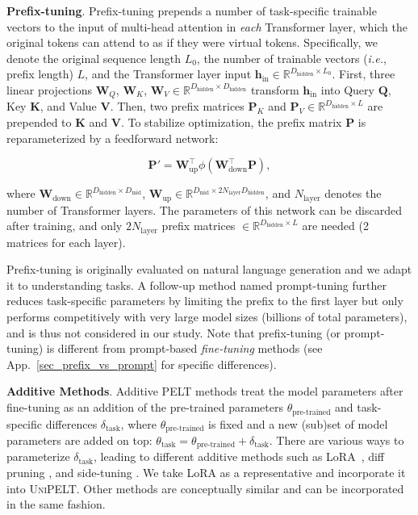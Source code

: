 {{\bf Prefix-tuning}.} Prefix-tuning \cite{li-liang-2021-prefix} prepends a number of task-specific trainable vectors to the input of multi-head attention in \textit{each} Transformer layer, which the original tokens can attend to as if they were virtual tokens. Specifically, we denote the original sequence length $L_0$, the number of trainable vectors (\textit{i.e.}, prefix length) $L$, and the Transformer layer input ${\bm{h}}_{\text{in}} \in {\mathbb{R}}^{D_{\text{hidden}} \times L_0}$. First, three linear projections ${\bm{W}}_Q$, ${\bm{W}}_K$, ${\bm{W}}_V  \in {\mathbb{R}}^{D_{\text{hidden}} \times D_{\text{hidden}}}$ transform ${\bm{h}}_{\text{in}}$ into Query ${\bm{Q}}$, Key ${\bm{K}}$, and Value ${\bm{V}}$.
Then, two prefix matrices ${\bm{P}}_K$ and ${\bm{P}}_V \in {\mathbb{R}}^{D_{\text{hidden}} \times L}$ are prepended to ${\bm{K}}$ and ${\bm{V}}$.
To stabilize optimization, the prefix matrix ${\bm{P}}$ is reparameterized by a feedforward network:

\begin{equation}
    {\bm{P}}' = {\bm{W}}_{\text{up}}^\intercal \phi({\bm{W}}_{\text{down}}^\intercal {\bm{P}}),
\end{equation}

where ${\bm{W}}_{\text{down}} \in {\mathbb{R}}^{D_{\text{hidden}} \times D_{\text{mid}}}$, ${\bm{W}}_{\text{up}} \in {\mathbb{R}}^{D_{\text{mid}} \times 2 N_{\text{layer}} D_{\text{hidden}}}$, and $N_{\text{layer}}$ denotes the number of Transformer layers. The parameters of this network can be discarded after training, and only $2N_{\text{layer}}$ prefix matrices $\in {\mathbb{R}}^{D_{\text{hidden}} \times L}$ are needed (2 matrices for each layer).

Prefix-tuning is originally evaluated on natural language generation and we adapt it to understanding tasks. A follow-up method named prompt-tuning \cite{lester2021power} further reduces task-specific parameters by limiting the prefix to the first layer but only performs competitively with very large model sizes (billions of total parameters), and is thus not considered in our study. Note that prefix-tuning (or prompt-tuning) is different from prompt-based \textit{fine-tuning} methods \cite{schick-schutze-2021-exploiting,gao-etal-2021-making} (see App.~\ref{sec_prefix_vs_prompt} for specific differences).

{{\bf Additive Methods}.} Additive PELT methods treat the model parameters after fine-tuning as an addition of the pre-trained parameters $\theta_{\text{pre-trained}}$ and task-specific differences $\delta_{\text{task}}$, where $\theta_{\text{pre-trained}}$ is fixed and a new (sub)set of model parameters are added on top: $\theta_{\text{task}} = \theta_{\text{pre-trained}} + \delta_{\text{task}}$. 
There are various ways to parameterize $\delta_{\text{task}}$, leading to different additive methods such as LoRA~\cite{hu2021lora}, diff pruning \cite{guo-etal-2021-parameter}, and side-tuning \cite{zhang2020side}. We take LoRA as a representative and incorporate it into \textsc{UniPELT}. Other methods are conceptually similar and can be incorporated in the  same fashion.

